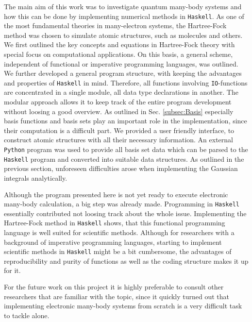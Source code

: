 \documentclass[twoside,        %
			   11pt,			%
               BCOR10mm,       %
               ngerman,english  %
               ]{scrartcl}
\begin{document}
The main aim of this work was to investigate quantum many-body systems and how this can be done by implementing numerical methods in \texttt{Haskell}. As one of the most fundamental theories in many-electron systems, the Hartree-Fock method was chosen to simulate atomic structures, such as molecules and others. We first outlined the key concepts and equations in Hartree-Fock theory with special focus on computational applications. On this basis, a general scheme, independent of functional or imperative programming languages, was outlined. We further developed a general program structure, with keeping the advantages and properties of \texttt{Haskell} in mind. Therefore, all functions involving \texttt{IO}-functions are concentrated in a single module, all data type declarations in another. The modular approach allows it to keep track of the entire program development without loosing a good overview.
As outlined in Sec. \ref{subsec:Basis} especially basis functions and basis sets play an important role in the implementation, since their computation is a difficult part.
We provided a user friendly interface, to construct atomic structures with all their necessary information. An external \texttt{Python} program was used to provide all basis set data which can be parsed to the \texttt{Haskell} program and converted into suitable data structures. As outlined in the previous section, unforeseen difficulties arose when implementing the Gaussian integrals analytically.

Although the program presented here is not yet ready to execute electronic many-body calculation, a big step was already made. Programming in \texttt{Haskell} essentially contributed not loosing track about the whole issue. Implementing the Hartree-Fock method in \texttt{Haskell} shows, that this functional programming language is well suited for scientific methods. Although for researchers with a background of imperative programming languages, starting to implement scientific methods in \texttt{Haskell} might be a bit cumbersome, the advantages of reproducibility and purity of functions as well as the coding structure makes it up for it.

For the future work on this project it is highly preferable to consult other researchers that are familiar with the topic, since it quickly turned out that implementing electronic many-body systems from scratch is a very difficult task to tackle alone. 

\pagebreak

    \nocite{*}
 
\end{document}
